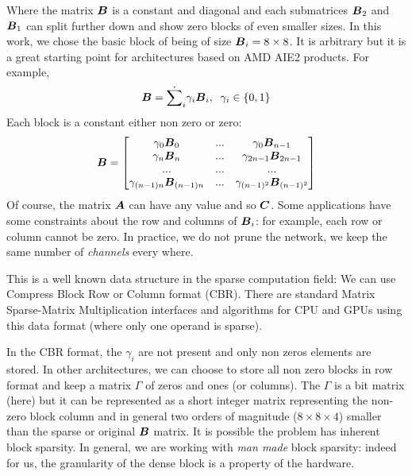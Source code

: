\documentclass[conference]{IEEEtran}
\begin{document}
Where the matrix ${\boldsymbol B}$ is a constant and diagonal and each
submatrices ${\boldsymbol B_2}$ and ${\boldsymbol B}_1$ can split further down and show
zero blocks of even smaller sizes. In this work, we chose the basic
block of being of size ${\boldsymbol B}_i = 8\times 8$. It is arbitrary but it
is a great starting point for architectures based on AMD AIE2
products.  For example,
\begin{equation}
  {\boldsymbol B} = \dot{\sum}_i \gamma_i {\boldsymbol B}_i, \;\; \gamma_i \in \{0,1\} 
\end{equation}
Each block is a constant either non zero or zero:
{\small \begin{equation*}
  {\boldsymbol B} = 
  \begin{bmatrix}
    \gamma_0{\boldsymbol B}_0   &  ... &   \gamma_0{\boldsymbol B}_{n-1} \\
    \gamma_n{\boldsymbol B}_{n} &  ... &   \gamma_{2n-1}{\boldsymbol B}_{2n-1} \\
    ...               &  ... &   ... \\
    \gamma_{(n-1)n}{\boldsymbol B}_{(n-1)n} & ... &   \gamma_{(n-1)^2}{\boldsymbol B}_{(n-1)^2} \\
  \end{bmatrix}
\end{equation*}}
Of course, the matrix ${\boldsymbol A}$ can have any value and so
${\boldsymbol C}$. Some applications have some constraints about the row and
columns of ${\boldsymbol B}_i$: for example, each row or column cannot be
zero. In practice, we do not prune the network, we keep the same
number of {\em channels} every where.

This is a well known data structure in the sparse computation field:
We can use Compress Block Row or Column format (CBR). There are
standard Matrix Sparse-Matrix Multiplication interfaces and algorithms
for CPU and GPUs using this data format (where only one operand is
sparse).

In the CBR format, the $\gamma_i$ are not present and only non zeros
elements are stored. In other architectures, we can choose to store
all non zero blocks in row format and keep a matrix $\Gamma$ of zeros
and ones (or columns). The $\Gamma$ is a bit matrix (here) but it can
be represented as a short integer matrix representing the non-zero
block column and in general two orders of magnitude ($8\times 8 \times
4$) smaller than the sparse or original ${\boldsymbol B}$ matrix. It is
possible the problem has inherent block sparsity. In general, we are
working with {\em man made} block sparsity: indeed for us, the
granularity of the dense block is a property of the hardware.
\end{document}
